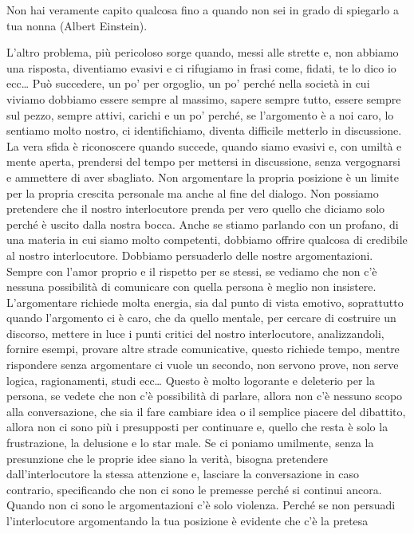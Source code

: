 \documentclass[12pt]{book} %
\begin{document}
Non hai veramente capito qualcosa fino a quando non sei in grado di spiegarlo a tua nonna (Albert Einstein).

L'altro problema, più pericoloso sorge quando, messi alle strette e, non abbiamo una risposta,
diventiamo evasivi e ci rifugiamo in frasi come, fidati, te lo dico io ecc… Può succedere, un po' per orgoglio, un po'
perché nella società in cui viviamo dobbiamo essere sempre al massimo, sapere sempre tutto, essere sempre sul pezzo,
sempre attivi, carichi e un po' perché, se l'argomento è a noi caro, lo sentiamo molto nostro, ci
identifichiamo, diventa difficile metterlo in discussione. La vera sfida è riconoscere quando succede, quando siamo
evasivi e, con umiltà e mente aperta, prendersi del tempo per mettersi in discussione, senza vergognarsi e ammettere di
aver sbagliato. Non argomentare la propria posizione è un limite per la propria crescita personale ma anche al fine del
dialogo. Non possiamo pretendere che il nostro interlocutore prenda per vero quello che diciamo solo perché è uscito
dalla nostra bocca. Anche se stiamo parlando con un profano, di una materia in cui siamo molto competenti, dobbiamo
offrire qualcosa di credibile al nostro interlocutore. Dobbiamo persuaderlo delle nostre argomentazioni. Sempre con
l'amor proprio e il rispetto per se stessi, se vediamo che non c'è nessuna
possibilità di comunicare con quella persona è meglio non insistere. L'argomentare richiede molta
energia, sia dal punto di vista emotivo, soprattutto quando l'argomento ci è caro, che da quello
mentale, per cercare di costruire un discorso, mettere in luce i punti critici del nostro interlocutore, analizzandoli,
fornire esempi, provare altre strade comunicative, questo richiede tempo, mentre rispondere senza argomentare ci vuole
un secondo, non servono prove, non serve logica, ragionamenti, studi ecc… Questo è molto logorante e deleterio per la
persona, se vedete che non c'è possibilità di parlare, allora non c'è nessuno
scopo alla conversazione, che sia il fare cambiare idea o il semplice piacere del dibattito, allora non ci sono più i
presupposti per continuare e, quello che resta è solo la frustrazione, la delusione e lo star male. Se ci poniamo
umilmente, senza la presunzione che le proprie idee siano la verità, bisogna pretendere dall'interlocutore la stessa
attenzione e, lasciare la conversazione in caso contrario, specificando che non ci sono le premesse perché si continui
ancora. Quando non ci sono le argomentazioni c'è solo violenza. Perché se non persuadi
l'interlocutore argomentando la tua posizione è evidente che c'è la pretesa
\end{document}
